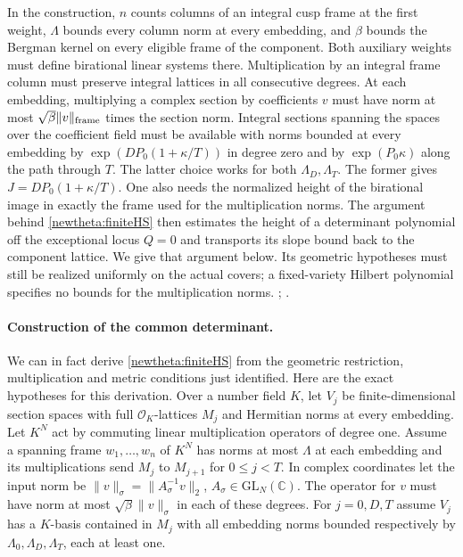 In the construction, \(n\) counts columns of an integral cusp frame
at the first weight, \(\Lambda\) bounds every column norm at every
embedding, and \(\beta\) bounds the Bergman kernel on every eligible
frame of the component. Both auxiliary weights must define
birational linear systems there. Multiplication by an integral frame
column must preserve integral lattices in all consecutive degrees.
At each embedding, multiplying a complex section by coefficients
\(v\) must have norm at most \(\sqrt\beta\|v\|_{\rm frame}\) times
the section norm. Integral sections spanning the spaces over the
coefficient field must be available with norms bounded at every
embedding by \(\exp(DP_0(1+\kappa/T))\) in degree zero and by
\(\exp(P_0\kappa)\) along the path through \(T\). The latter choice
works for both \(\Lambda_D,\Lambda_T\). The former gives
\(J=DP_0(1+\kappa/T)\). One also needs the normalized height of the
birational image in exactly the frame used for the multiplication
norms. The argument behind \eqref{newtheta:finiteHS} then estimates
the height of a determinant polynomial off the exceptional locus
\(Q=0\) and transports its slope bound back to the component
lattice. We give that argument below. Its geometric hypotheses must
still be realized uniformly on the actual covers; a fixed-variety
Hilbert polynomial specifies no bounds for the multiplication norms.
;
.

\paragraph{Construction of the common determinant.}
We can in fact derive \eqref{newtheta:finiteHS} from the geometric
restriction, multiplication and metric conditions just identified.
Here are the exact hypotheses for this derivation. Over a number
field \(K\), let \(V_j\) be finite-dimensional section spaces with
full \(\mathcal O_K\)-lattices \(M_j\) and Hermitian norms at every
embedding. Let \(K^N\) act by commuting linear multiplication operators
of degree one. Assume a spanning frame \(w_1,\ldots,w_n\) of \(K^N\)
has norms at most \(\Lambda\) at each embedding and its multiplications
send \(M_j\) to \(M_{j+1}\) for \(0\le j<T\).
In complex coordinates let the input norm be
\(\|v\|_\sigma=\|A_\sigma^{-1}v\|_2\), \(A_\sigma\in\mathrm{GL}_N(\mathbb C)\).
The operator for \(v\) must have norm at most
\(\sqrt\beta\|v\|_\sigma\) in each of these degrees. For \(j=0,D,T\)
assume \(V_j\) has a \(K\)-basis contained in \(M_j\) with all
embedding norms bounded respectively by \(\Lambda_0,\Lambda_D,\Lambda_T\),
each at least one.

